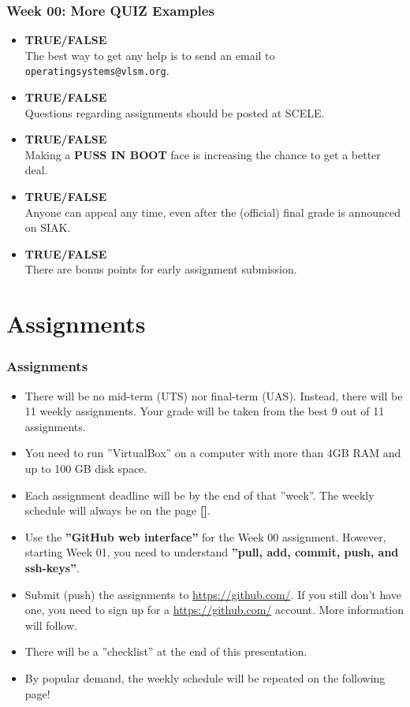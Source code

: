 \documentclass[xcolor=table, notheorems, hyperref={pdfpagelabels=false}]{beamer}
\begin{document}
\begin{frame}
\frametitle{Week 00: More QUIZ Examples}
\begin{itemize}
\item \textbf{TRUE/FALSE}\\
      The best way to get any help is to send an email to \texttt{operatingsystems@vlsm.org}.
\item \textbf{TRUE/FALSE}\\
      Questions regarding assignments should be posted at SCELE.
\item \textbf{TRUE/FALSE}\\
      Making a \textbf{PUSS IN BOOT} face is increasing the chance to get a better deal.
\item \textbf{TRUE/FALSE}\\
      Anyone can appeal any time, even after the (official) final grade is announced on SIAK.
\item \textbf{TRUE/FALSE}\\
      There are bonus points for early assignment submission.
\end{itemize}
\end{frame}

\section{Assignments}
\begin{frame}[fragile]
\frametitle{Assignments}
\begin{itemize}
\item There will be no mid-term (UTS) nor final-term (UAS). 
      Instead, there will be 11 weekly assignments.
      Your grade will be taken from the best 9 out of 11 assignments.
\item You need to run ''VirtualBox'' on a computer with more than 4GB RAM and up to 100 GB disk space.
\item Each assignment deadline will be by the end of that ''week''. 
      The weekly schedule will always be on the page \textbf{[\pageref{laman}]}.
\item Use the \textbf{''GitHub web interface''} for the Week 00 assignment.
      However, starting Week 01, you need to understand \textbf{''pull, add, commit, push, and ssh-keys''}.
\item Submit (push) the assignments to \url{https://github.com/}.
      If you still don't have one, you need to sign up for a \url{https://github.com/} account.
      More information will follow.
\item There will be a ''checklist'' at the end of this presentation.
\item By popular demand, the weekly schedule will be repeated on the following page!
\end{itemize}
\end{frame}
\end{document}
